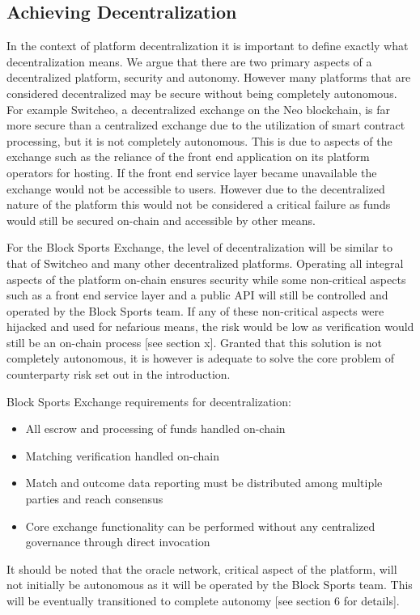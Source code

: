 \documentclass{article}
\begin{document}
	\clearpage
	\subsection{Achieving Decentralization}
In the context of platform decentralization it is important to define exactly what decentralization means. We argue that there are two primary aspects of a decentralized platform, security and autonomy. However many platforms that are considered decentralized may be secure without being completely autonomous. For example Switcheo, a decentralized exchange on the Neo blockchain, is far more secure than a centralized exchange due to the utilization of smart contract processing, but it is not completely autonomous. This is due to aspects of the exchange such as the reliance of the front end application on its platform operators for hosting. If the front end service layer became unavailable the exchange would not be accessible to users. However due to the decentralized nature of the platform this would not be considered a critical failure as funds would still be secured on-chain and accessible by other means.

For the Block Sports Exchange, the level of decentralization will be similar to that of Switcheo and many other decentralized platforms. Operating all integral aspects of the platform on-chain ensures security while some non-critical aspects such as a front end service layer and a public API will still be controlled and operated by the Block Sports team. If any of these non-critical aspects were hijacked and used for nefarious means, the risk would be low as verification would still be an on-chain process [see section x]. Granted that this solution is not completely autonomous, it is however is adequate to solve the core problem of counterparty risk set out in the introduction.

Block Sports Exchange requirements for decentralization:
\begin{itemize}
	\item All escrow and processing of funds handled on-chain
	\item Matching verification handled on-chain
	\item Match and outcome data reporting must be distributed among multiple parties and reach consensus
	\item Core exchange functionality can be performed without any centralized governance through direct invocation
\end{itemize}

It should be noted that the oracle network, critical aspect of the platform, will not initially be autonomous as it will be operated by the Block Sports team. This will be eventually transitioned to complete autonomy [see section 6 for details].
\end{document}
